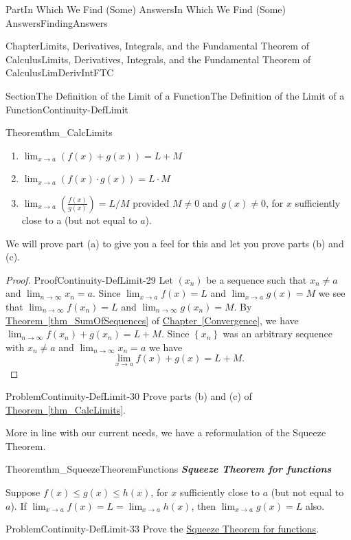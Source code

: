 \documentclass[oneside,10pt,]{book}
\newcommand{\xreffont}{\relax}
\newcommand{\alert}[1]{\textbf{\textit{#1}}}
\numberwithin{equation}{part}
\def\limit#1#2#3{{\displaystyle\lim_{#1\rightarrow #2}#3}}
\begin{document}
\begin{partptx}{Part}{In Which We Find (Some) Answers}{}{In Which We Find (Some) Answers}{}{}{FindingAnswers}
\begin{chapterptx}{Chapter}{Limits, Derivatives, Integrals, and the Fundamental Theorem of Calculus}{}{Limits, Derivatives, Integrals, and the Fundamental Theorem of Calculus}{}{}{LimDerivIntFTC}
\begin{sectionptx}{Section}{The Definition of the Limit of a Function}{}{The Definition of the Limit of a Function}{}{}{Continuity-DefLimit}
\begin{theorem}{Theorem}{}{}{thm_CalcLimits}
\begin{enumerate}[label={(\alph*)}]
\item{}\(\displaystyle \limit{x}{a}{\left(f(x)+g(x)\right)}=L+M\)%
\item{}\(\displaystyle \limit{x}{a}{\left(f(x)\cdot g(x)\right)}=L\cdot M\)%
\item{}\(\limit{x}{a}{\left(\frac{f(x)}{g(x)}\right)}=L/M\) provided \(M\ne0\) and \(g(x)\ne{}0\), for \(x\) sufficiently close to a (but not equal to \(a\)).%
\end{enumerate}
%
\end{theorem}
We will prove part (a) to give you a feel for this and let you prove parts (b) and (c).%
\begin{proof}{Proof}{}{Continuity-DefLimit-29}
Let \(\left(x_n\right)\) be a sequence such that \(x_n\ne a\) and \(\limit{n}{\infty}{x_n}=a\).  Since \(\limit{x}{a}{f(x)} = L\) and \(\limit{x}{a}{g(x)} = M\) we see that \(\limit{n}{\infty}{f(x_n)} = L\) and \(\limit{n}{\infty}{g(x_n)} = M\).  By \hyperref[thm_SumOfSequences]{Theorem~{\xreffont\ref{thm_SumOfSequences}}} of \hyperref[Convergence]{Chapter~{\xreffont\ref{Convergence}}}, we have \(\limit{n}{\infty}{f(x_n)+g(x_n)}=L+M\).  Since \(\left\{x_n\right\}\) was an arbitrary sequence with \(x_n\ne a\) and \(\limit{n}{\infty}{x_n} = a\) we have%
\begin{equation*}
\limit{x}{a}{f(x)+g(x)} = L+M \text{.}
\end{equation*}
%
\end{proof}
\begin{problem}{Problem}{}{Continuity-DefLimit-30}%
 Prove parts (b) and (c) of \hyperref[thm_CalcLimits]{Theorem~{\xreffont\ref{thm_CalcLimits}}}.%
\end{problem}
More in line with our current needs, we have a reformulation of the Squeeze Theorem.%
\begin{theorem}{Theorem}{}{}{thm_SqueezeTheoremFunctions}%
\alert{Squeeze Theorem for functions}%
\par
{} Suppose \(f(x)\le g(x) \le h(x)\), for \(x\) sufficiently close to \(a\) (but not equal to \(a\)).  If \(\limit{x}{a}{f(x)}=L=\limit{x}{a}{h(x)}\), then \(\limit{x}{a}{g(x)}=L\) also.%
\end{theorem}
\begin{problem}{Problem}{}{Continuity-DefLimit-33}%
 Prove the \hyperref[thm_SqueezeTheoremFunctions]{Squeeze Theorem for functions}.%

\end{problem}
\end{sectionptx}
\end{chapterptx}
\end{partptx}
\end{document}
